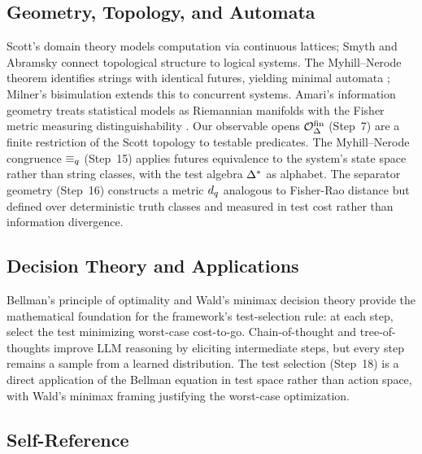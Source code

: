 \subsection{Geometry, Topology, and Automata}
\label{sec:related:geometry}

Scott's domain theory \citep{scott1970} models computation via continuous
lattices; Smyth \citep{smyth1983} and Abramsky \citep{abramsky1994} connect
topological structure to logical systems.  The Myhill--Nerode
theorem \citep{myhill1957,nerode1958} identifies strings with identical
futures, yielding minimal automata \citep{hopcroft1979}; Milner's
bisimulation \citep{milner1989} extends this to concurrent systems.
Amari's information geometry \citep{amari2016} treats statistical models
as Riemannian manifolds with the Fisher metric measuring
distinguishability \citep{rao1945}.  Our observable opens $\mathcal{O}^{\mathrm{fin}}_\Delta$
(Step~7) are a finite restriction of the Scott topology to testable
predicates.  The Myhill--Nerode congruence $\equiv_q$ (Step~15) applies
futures equivalence to the system's state space rather than string classes,
with the test algebra $\Delta^*$ as alphabet.  The separator geometry
(Step~16) constructs a metric $d_q$ analogous to Fisher-Rao distance
but defined over deterministic truth classes and measured in test cost
rather than information divergence.

\subsection{Decision Theory and Applications}
\label{sec:related:applications}

Bellman's principle of optimality \citep{bellman1957} and Wald's minimax
decision theory \citep{wald1950} provide the mathematical foundation for
the framework's test-selection rule: at each step, select the test minimizing
worst-case cost-to-go.  Chain-of-thought \citep{wei2022} and
tree-of-thoughts \citep{yao2023} improve LLM reasoning by eliciting
intermediate steps, but every step remains a sample from a learned
distribution.  The \Opoch{} test selection (Step~18) is a direct application
of the Bellman equation in test space rather than action space, with
Wald's minimax framing justifying the worst-case optimization.

\subsection{Self-Reference}
\label{sec:related:selfref}


